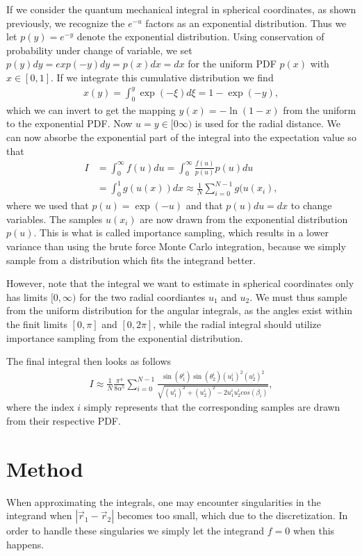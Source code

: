 \documentclass[twocolumn]{aastex62}
\begin{document}
If we consider the quantum mechanical integral in spherical coordinates, as
shown previously, we recognize the $e^{-u}$ factors as an exponential
distribution. Thus we let $p(y) = e^{-y}$ denote the exponential distribution.
Using conservation of probability under change of variable, we set $p(y)dy =
exp(-y)dy = p(x)dx = dx$ for the uniform PDF $p(x)$ with $x\in[0,1]$. If we
integrate this cumulative distribution we find 
\begin{align}
	x(y) = \int^y_0 \exp(-\xi)d\xi = 1 - \exp(-y),
\end{align} 
which we can invert to get the mapping $y(x) = -\ln(1-x)$ from the uniform to
the exponential PDF. Now $u = y\in[0\infty)$ is used for the radial distance. We
can now absorbe the exponential part of the integral into the expectation value
so that 
\begin{align}
	I &= \int^\infty_0 f(u)du = \int_0^\infty \frac{f(u)}{p(u)}p(u)du \\
	&= \int^1_0 g(u(x))dx \approx \frac{1}{N}\sum_{i=0}^{N-1} g(u(x_i), 
\end{align}
where we used that $p(u) = \exp(-u)$ and that $p(u)du = dx$ to change variables.
The samples $u(x_i)$ are now drawn from the exponential distribution $p(u)$.
This is what is called importance sampling, which results in a lower variance
than using the brute force Monte Carlo integration, because we simply sample
from a distribution which fits the integrand better. 

However, note that the integral we want to estimate in spherical coordinates
only has limits $[0, \infty)$ for the two radial coordiantes $u_1$ and $u_2$. We
must thus sample from the uniform distribution for the angular integrals, as the
angles exist within the finit limits $[0,\pi]$ and $[0, 2\pi]$, while the radial
integral should utilize importance sampling from the exponential distribution.

The final integral then looks as follows
\begin{align}
	I \approx \frac{1}{N}\frac{\pi^4}{8\alpha^5}\sum^{N-1}_{i=0}\frac{\sin
	(\theta_1^i)\sin(\theta_2^i)(u_1^i)^2(u_2^i)^2}{\sqrt{(u_1^i)^2 + (u_2^i)^2 - 2u_1^iu_2^icos(\beta_i)}},
\end{align}
where the index $i$ simply represents that the corresponding samples are drawn
from their respective PDF.
\section{Method} \label{sec:method}
When approximating the integrals, one may encounter singularities in the
integrand when $|\vec{r}_1 - \vec{r}_2|$ becomes too small, which due to the
discretization. In order to handle these singularies we simply let the integrand
$f=0$ when this happens.
\end{document}
